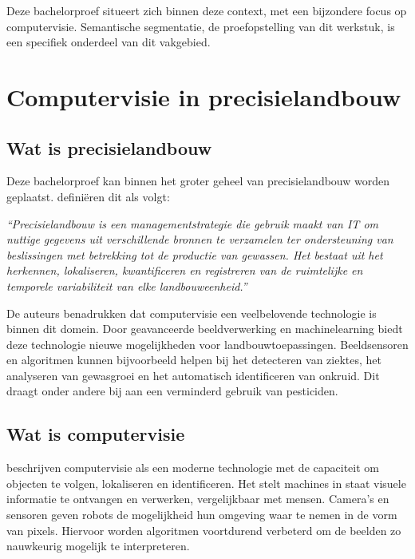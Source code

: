Deze bachelorproef situeert zich binnen deze context, met een bijzondere focus op computervisie. Semantische segmentatie, de proefopstelling van dit werkstuk, is een specifiek onderdeel van dit vakgebied.

\section{Computervisie in precisielandbouw}
\subsection{Wat is precisielandbouw}
Deze bachelorproef kan binnen het groter geheel van precisielandbouw worden geplaatst. \textcite{Cisternas2020} definiëren dit als volgt: 

\begin{tcolorbox}[colback=gray!5, colframe=white, sharp corners, boxrule=0pt, width=\linewidth]
    \textit{“Precisielandbouw is een managementstrategie die gebruik maakt van IT om nuttige gegevens uit verschillende bronnen te verzamelen ter ondersteuning van beslissingen met betrekking tot de productie van gewassen. Het bestaat uit het herkennen, lokaliseren, kwantificeren en registreren van de ruimtelijke en temporele variabiliteit van elke landbouweenheid.”} 
\end{tcolorbox}

De auteurs benadrukken dat computervisie een veelbelovende technologie is binnen dit domein. Door geavanceerde beeldverwerking en machinelearning biedt deze technologie nieuwe mogelijkheden voor landbouwtoepassingen. Beeldsensoren en algoritmen kunnen bijvoorbeeld helpen bij het detecteren van ziektes, het analyseren van gewasgroei en het automatisch identificeren van onkruid. Dit draagt onder andere bij aan een verminderd gebruik van pesticiden.

\subsection{Wat is computervisie}
\textcite{Radojcic2023} beschrijven computervisie als een moderne technologie met de capaciteit om objecten te volgen, lokaliseren en identificeren. Het stelt machines in staat visuele informatie te ontvangen en verwerken, vergelijkbaar met mensen. Camera’s en sensoren geven robots de mogelijkheid hun omgeving waar te nemen in de vorm van pixels. Hiervoor worden algoritmen voortdurend verbeterd om de beelden zo nauwkeurig mogelijk te interpreteren. 

